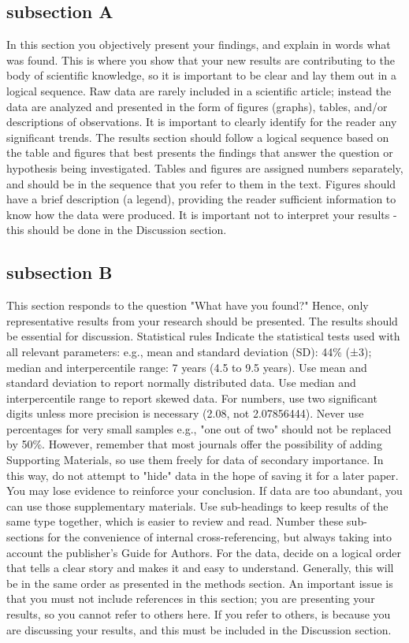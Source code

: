 \documentclass[a4paper, 10pt, conference]{ieeeconf}      %
\begin{document}
\subsection{subsection A}

In this section you objectively present your findings, and explain in words what was found. This is where you show that your new results are contributing to the body of scientific knowledge, so it is important to be clear and lay them out in a logical sequence. Raw data are rarely included in a scientific article; instead the data are analyzed and presented in the form of figures (graphs), tables, and/or descriptions of observations. It is important to clearly identify for the reader any significant trends. The results section should follow a logical sequence based on the table and figures that best presents the findings that answer the question or hypothesis being investigated. Tables and figures are assigned numbers separately, and should be in the sequence that you refer to them in the text. Figures should have a brief description (a legend), providing the reader sufficient information to know how the data were produced. It is important not to interpret your results - this should be done in the Discussion section.


\subsection{subsection B}

This section responds to the question "What have you found?" Hence, only representative results from your research should be presented. The results should be essential for discussion.
Statistical rules
Indicate the statistical tests used with all relevant parameters: e.g., mean and standard deviation (SD): 44\% (±3); median and interpercentile range: 7 years (4.5 to 9.5 years).
Use mean and standard deviation to report normally distributed data.
Use median and interpercentile range to report skewed data.
For numbers, use two significant digits unless more precision is necessary (2.08, not 2.07856444).
Never use percentages for very small samples e.g., "one out of two" should not be replaced by 50\%.
However, remember that most journals offer the possibility of adding Supporting Materials, so use them freely for data of secondary importance. In this way, do not attempt to "hide" data in the hope of saving it for a later paper. You may lose evidence to reinforce your conclusion. If data are too abundant, you can use those supplementary materials.
Use sub-headings to keep results of the same type together, which is easier to review and read. Number these sub-sections for the convenience of internal cross-referencing, but always taking into account the publisher's Guide for Authors.
For the data, decide on a logical order that tells a clear story and makes it and easy to understand. Generally, this will be in the same order as presented in the methods section.
An important issue is that you must not include references in this section; you are presenting your results, so you cannot refer to others here. If you refer to others, is because you are discussing your results, and this must be included in the Discussion section.
\end{document}
